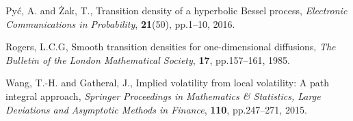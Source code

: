 \documentclass[12pt, reqno]{amsart}
\numberwithin{equation}{section}
\begin{document}
\begin{thebibliography}{19}
{\sc Py\'c, A.} and {\sc \.Zak, T.},
{Transition density of a hyperbolic Bessel process},
{\em Electronic Communications in Probability}, {\bf 21}(50), pp.1--10, 2016.

{\sc Rogers, L.C.G},
{Smooth transition densities for one-dimensional diffusions},
{\em The Bulletin of the London Mathematical Society}, {\bf 17}, pp.157--161, 1985.

{\sc Wang, T.-H.} and {\sc Gatheral, J.},
{Implied volatility from local volatility: A path integral approach},
{\em Springer Proceedings in Mathematics \& Statistics,
Large Deviations and Asymptotic Methods in Finance}, {\bf 110}, pp.247--271, 2015.

\end{thebibliography}
\end{document}
